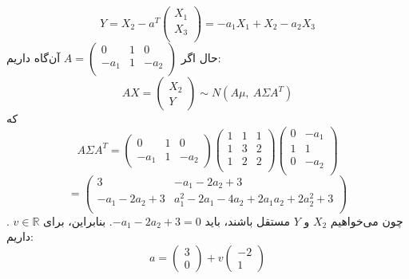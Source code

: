 \begin{enumerate}
	$$Y = X_2 - a^T\begin{pmatrix}
	X_1 \\
	X_3\\
	\end{pmatrix}
	= -a_1X_1 + X_2 - a_2X_3
	$$
	حال اگر 
	$A = \begin{pmatrix}
	0 & 1 & 0 \\
	-a_1 & 1 & -a_2\\
	\end{pmatrix}$
	آن‌گاه داریم: 
	$$AX = \begin{pmatrix}
	X_2\\
	Y
	\end{pmatrix}
	\sim N(A\mu, \: A\Sigma A^T)
	$$
	که 
	$$
	A\Sigma A^T = \begin{pmatrix}
	0 & 1 & 0 \\
	-a_1 & 1 & -a_2
	\end{pmatrix}
	\begin{pmatrix}
	1 & 1 & 1 \\
	1 & 3 & 2 \\
	1 & 2 & 2 \\
	\end{pmatrix}
	\begin{pmatrix}
	0 & -a_1 \\
	1 & 1 \\
	0 & -a_2\\
	\end{pmatrix}
	$$
	$$
	= \begin{pmatrix}
	3 & -a_1 - 2a_2 + 3 \\
	-a_1 - 2a_2 + 3 & a_1^2 - 2a_1 - 4a_2 + 2a_1a_2 + 2a_2^2 + 3\\
	\end{pmatrix}
	$$.
	چون می‌خواهیم $X_2$ و $Y$ مستقل باشند، باید $-a_1 - 2a_2 + 3 = 0$. بنابراین،
	برای $v \in \mathbb{R}$ داریم:
	$$a = \begin{pmatrix}
	3 \\
	0
	\end{pmatrix}
	+ v \begin{pmatrix}
	-2 \\
	1
	\end{pmatrix}
	$$
	
\end{enumerate}